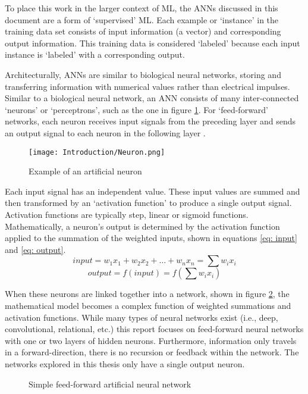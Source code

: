 To place this work in the larger context of ML, the ANNs discussed in this document are a form of `supervised' ML. Each example or `instance' in the training data set consists of input information (a vector) and corresponding output information. This training data is considered `labeled' because each input instance is `labeled' with a corresponding output.

Architecturally, ANNs are similar to biological neural networks, storing and transferring information with numerical values rather than electrical impulses. Similar to a biological neural network, an ANN consists of many inter-connected `neurons' or `perceptrons', such as the one in figure \ref{fig:neuron}. For `feed-forward' networks, each neuron receives input signals from the preceding layer and sends an output signal to each neuron in the following layer \cite{Jacobson_2013}. 
	\begin{figure}[ht]
	    \centering
	    \texttt{[image: Introduction/Neuron.png]}
	    \caption{Example of an artificial neuron}
	    \label{fig:neuron}
	\end{figure}
Each input signal has an independent value. These input values are summed and then transformed by an `activation function' to produce a single output signal. Activation functions are typically step, linear or sigmoid functions. Mathematically, a neuron's output is determined by the activation function applied to the summation of the weighted inputs, shown in equations \ref{eq: input} and \ref{eq: output}.
	\begin{equation}
		input = w_1 x_1 + w_2 x_2 + \ldots + w_n x_n = \sum w_i x_i
		\label{eq: input} \end{equation}
	\begin{equation}
		output = f(input) = f\left( \sum w_i x_i \right)
		\label{eq: output} \end{equation}

When these neurons are linked together into a network, shown in figure \ref{fig:ANN}, the mathematical model becomes a complex function of weighted summations and activation functions. While many types of neural networks exist (i.e., deep, convolutional, relational, etc.) this report focuses on feed-forward neural networks with one or two layers of hidden neurons. Furthermore, information only travels in a forward-direction, there is no recursion or feedback within the network. The networks explored in this thesis only have a single output neuron.
	\begin{figure}[ht]
	    \centering
	    
        \caption{Simple feed-forward artificial neural network}
		\label{fig:ANN}
		\end{figure}

